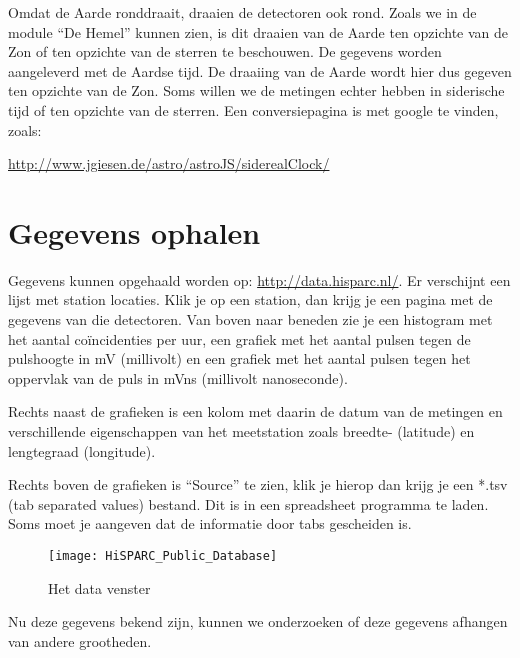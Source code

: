 Omdat de Aarde ronddraait, draaien de detectoren ook rond. Zoals we
in de module {}``De Hemel'' kunnen zien, is dit draaien van de Aarde
ten opzichte van de Zon of ten opzichte van de sterren te beschouwen.
De gegevens worden aangeleverd met de Aardse tijd. De draaiing van
de Aarde wordt hier dus gegeven ten opzichte van de Zon. Soms willen
we de metingen echter hebben in siderische tijd of ten opzichte van
de sterren. Een conversiepagina is met google te vinden, zoals:

\url{http://www.jgiesen.de/astro/astroJS/siderealClock/}


\section{Gegevens ophalen}

Gegevens kunnen opgehaald worden op: \url{http://data.hisparc.nl/}. Er
verschijnt een lijst met station locaties. Klik je op een station, dan
krijg je een pagina met de gegevens van die detectoren. Van boven naar
beneden zie je een histogram met het aantal coïncidenties per uur, een
grafiek met het aantal pulsen tegen de pulshoogte in mV (millivolt) en
een grafiek met het aantal pulsen tegen het oppervlak van de puls in
mVns (millivolt nanoseconde).

Rechts naast de grafieken is een kolom met daarin de datum van de
metingen en verschillende eigenschappen van het meetstation zoals
breedte- (latitude) en lengtegraad (longitude).

Rechts boven de grafieken is {}``Source'' te zien, klik je hierop
dan krijg je een {*}.tsv (tab separated values) bestand. Dit is
in een spreadsheet programma te laden. Soms moet je aangeven dat de
informatie door tabs gescheiden is.

\begin{figure}[h]
\centering

\texttt{[image: HiSPARC\_Public\_Database]}

\caption{Het data venster}
\end{figure}

Nu deze gegevens bekend zijn, kunnen we onderzoeken of deze gegevens
afhangen van andere grootheden.


